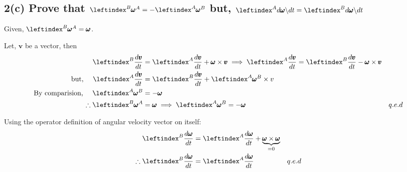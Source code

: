 \subsection{2(c) Prove that $\lx{^B}{\pmb \omega}^A = -\lx{^A}{\pmb \omega}^B$
but,
$\lx{^A}{d \pmb \omega \backslash d t}= \lx{^B}{{d \pmb \omega} \backslash {dt}}$
}

Given, $\lx{^B}{\pmb \omega}^A = \pmb \omega$.

Let, $\pmb v$ be a vector, then
\begin{align*}
    \lx{^B}{\frac{d \pmb v}{d t}} &= \lx{^A}{\frac{d \pmb v}{d t}} + \pmb \omega \times \pmb v
    \implies \lx{^A}{\frac{d \pmb v}{d t}}  = \lx{^B}{\frac{d \pmb v}{d t}} - \pmb \omega \times \pmb v\\
    \text{but, }\quad \lx{^A}{\frac{d \pmb v}{d t}}  &= \lx{^B}{\frac{d \pmb v}{d t}} + \lx{^A}{\pmb \omega}^B \times v\\
    \text{By comparision, }\quad  \lx{^A}{\pmb \omega}^B &= - \pmb \omega\\
    \therefore  \lx{^B}{\pmb \omega}^A &= \pmb \omega \implies \lx{^A}{\pmb \omega}^B = - \pmb \omega & q.e.d
\end{align*}

Using the operator definition of angular velocity vector on itself:
\begin{align*}
    \lx{^B}{\frac{d \pmb \omega }{d t}}  &= \lx{^A}{\frac{d \pmb \omega }{d t}} + \underbrace{\pmb \omega \times  \pmb \omega}_{=0} \\
    \therefore \lx{^B}{\frac{d \pmb \omega }{d t}}  &= \lx{^A}{\frac{d \pmb \omega }{d t}} &q.e.d\\
\end{align*}
